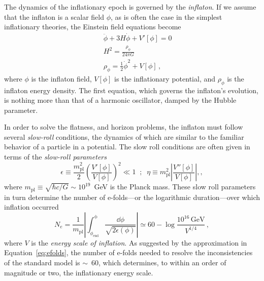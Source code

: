 The dynamics of the inflationary epoch is governed by the \textit{inflaton}. If we assume that the inflaton is a scalar field $\phi$, as is often the case in the simplest inflationary theories, the Einstein field equations become
\begin{eqnarray}
    & & \ddot{\phi} + 3 H \dot{\phi} + V'[\phi] = 0 \\ 
    & & H^{2} = \frac{\rho_{\phi}}{24 \pi G} \\
    & &\rho_{\phi} = \frac{1}{2} \dot{\phi}^{2} + V[\phi] \, ,
    \label{eq:inflaton}
\end{eqnarray}
where $\phi$ is the inflaton field, $V[\phi]$ is the inflationary potential, and $\rho_{\phi}$ is the inflaton energy density. The first equation, which governs the inflaton's evolution, is nothing more than that of a harmonic oscillator, damped by the Hubble parameter. 

In order to solve the flatness, and horizon problems, the inflaton must follow several \textit{slow-roll} conditions, the dynamics of which are similar to the familiar behavior of a particle in a potential. The slow roll conditions are often given in terms of the \textit{slow-roll parameters}
\begin{equation}
    \epsilon \equiv \frac{m_{\mathrm{pl}}^{2}}{2} \left( \frac{V'[\phi]}{V[\phi]} \right)^{2} \ll 1 \; \; ; \; \; \eta \equiv m_{\mathrm{pl}}^{2} \left| \frac{V''[\phi]}{V[\phi]} \right|, ,
    \label{eq:slow_roll_parameters}
\end{equation}
where $m_{\mathrm{pl}} \equiv \sqrt{\hbar c / G} \sim 10^{19}$~GeV is the Planck mass. These slow roll parameters in turn determine the number of e-folds---or the logarithmic duration---over which inflation occurred
\begin{equation}
    N_{e} = \frac{1}{m_{\mathrm{pl}}} \left| \int_{\phi_{\mathrm{end}}}^{\mathrm{\phi}} \frac{\dd \phi}{\sqrt{2 \epsilon(\phi)}} \right| \simeq 60 - \log{\frac{10^{16} \, \mathrm{GeV}}{V^{1/4}}} \, ,
    \label{eq:efolds}
\end{equation}
where $V$ is the \textit{energy scale of inflation}. As suggested by the approximation in Equation~\ref{eq:efolds}, the number of e-folds needed to resolve the inconsistencies of the standard model is $\sim$~60, which determines, to within an order of magnitude or two, the inflationary energy scale.

